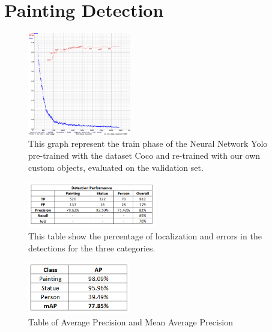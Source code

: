 \section{Painting Detection}

\begin{figure}
    \centering
        \includegraphics[width=0.4\textwidth]{pictures/painting_detection/chartv4.png}
    \caption{This graph represent the train phase of the Neural Network Yolo pre-trained with the dataset Coco and re-trained with our own custom objects, evaluated on the validation set.}
    \label{fig:figura1}
\end{figure}

\begin{figure}
    \centering
        \includegraphics[width=0.5\textwidth]{pictures/painting_detection/tabella3.png}
    \caption{This table show the percentage of localization and  errors in the detections for the three categories.}
    \label{fig:figura2}
\end{figure}

\begin{figure}[h]
    \centering
        \includegraphics[width=0.4\textwidth]{pictures/painting_detection/tabella2.png}
    \caption{Table of Average Precision and Mean Average Precision}
    \label{fig:figura3}
\end{figure} 

